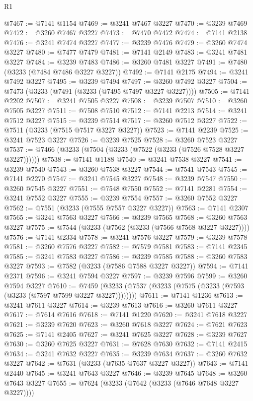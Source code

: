 \begin{lexlean}{R1}
\begin{coremodule}
@7467 := @7141 @1154
@7469 := @3241 @7467 @3227
@7470 := @3239 @7469
@7472 := @3260 @7467 @3227
@7473 := @7470 @7472
@7474 := @7141 @2138
@7476 := @3241 @7474 @3227
@7477 := @3239 @7476
@7479 := @3260 @7474 @3227
@7480 := @7477 @7479
@7481 := @7141 @2149
@7483 := @3241 @7481 @3227
@7484 := @3239 @7483
@7486 := @3260 @7481 @3227
@7491 := @7480 (@3233 (@7484 @7486 @3227 @3227))
@7492 := @7141 @2175
@7494 := @3241 @7492 @3227
@7495 := @3239 @7494
@7497 := @3260 @7492 @3227
@7504 := @7473 (@3233 (@7491 (@3233 (@7495 @7497 @3227 @3227))))
@7505 := @7141 @2202
@7507 := @3241 @7505 @3227
@7508 := @3239 @7507
@7510 := @3260 @7505 @3227
@7511 := @7508 @7510
@7512 := @7141 @2213
@7514 := @3241 @7512 @3227
@7515 := @3239 @7514
@7517 := @3260 @7512 @3227
@7522 := @7511 (@3233 (@7515 @7517 @3227 @3227))
@7523 := @7141 @2239
@7525 := @3241 @7523 @3227
@7526 := @3239 @7525
@7528 := @3260 @7523 @3227
@7537 := @7466 (@3233 (@7504 (@3233 (@7522 (@3233 (@7526 @7528 @3227 @3227))))))
@7538 := @7141 @1188
@7540 := @3241 @7538 @3227
@7541 := @3239 @7540
@7543 := @3260 @7538 @3227
@7544 := @7541 @7543
@7545 := @7141 @2270
@7547 := @3241 @7545 @3227
@7548 := @3239 @7547
@7550 := @3260 @7545 @3227
@7551 := @7548 @7550
@7552 := @7141 @2281
@7554 := @3241 @7552 @3227
@7555 := @3239 @7554
@7557 := @3260 @7552 @3227
@7562 := @7551 (@3233 (@7555 @7557 @3227 @3227))
@7563 := @7141 @2307
@7565 := @3241 @7563 @3227
@7566 := @3239 @7565
@7568 := @3260 @7563 @3227
@7575 := @7544 (@3233 (@7562 (@3233 (@7566 @7568 @3227 @3227))))
@7576 := @7141 @2334
@7578 := @3241 @7576 @3227
@7579 := @3239 @7578
@7581 := @3260 @7576 @3227
@7582 := @7579 @7581
@7583 := @7141 @2345
@7585 := @3241 @7583 @3227
@7586 := @3239 @7585
@7588 := @3260 @7583 @3227
@7593 := @7582 (@3233 (@7586 @7588 @3227 @3227))
@7594 := @7141 @2371
@7596 := @3241 @7594 @3227
@7597 := @3239 @7596
@7599 := @3260 @7594 @3227
@7610 := @7459 (@3233 (@7537 (@3233 (@7575 (@3233 (@7593 (@3233 (@7597 @7599 @3227 @3227))))))))
@7611 := @7141 @1236
@7613 := @3241 @7611 @3227
@7614 := @3239 @7613
@7616 := @3260 @7611 @3227
@7617 := @7614 @7616
@7618 := @7141 @1220
@7620 := @3241 @7618 @3227
@7621 := @3239 @7620
@7623 := @3260 @7618 @3227
@7624 := @7621 @7623
@7625 := @7141 @2405
@7627 := @3241 @7625 @3227
@7628 := @3239 @7627
@7630 := @3260 @7625 @3227
@7631 := @7628 @7630
@7632 := @7141 @2415
@7634 := @3241 @7632 @3227
@7635 := @3239 @7634
@7637 := @3260 @7632 @3227
@7642 := @7631 (@3233 (@7635 @7637 @3227 @3227))
@7643 := @7141 @2440
@7645 := @3241 @7643 @3227
@7646 := @3239 @7645
@7648 := @3260 @7643 @3227
@7655 := @7624 (@3233 (@7642 (@3233 (@7646 @7648 @3227 @3227))))

\end{coremodule}
\end{lexlean}
